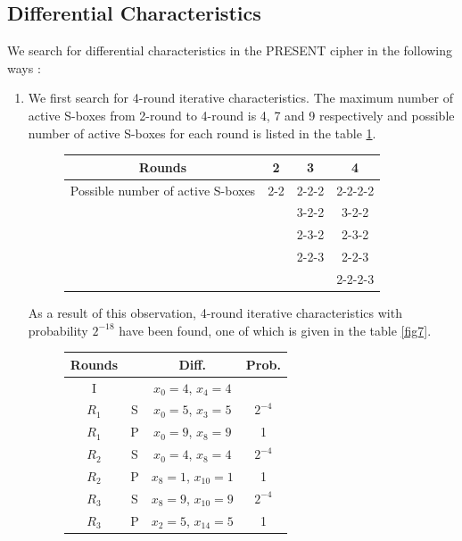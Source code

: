 \documentclass[preprint]{transcrypto}
\begin{document}
\subsection{Differential Characteristics} 
We search for differential characteristics in the PRESENT cipher in the following ways : 
\begin{enumerate}
    \item We first search for 4-round iterative characteristics. The maximum number of active S-boxes from 2-round to 4-round is 4, 7 and 9 respectively and possible number of active S-boxes for each round is listed in the table \ref{fig6}. 
    \begin{figure}[h!]
        \centering
        \begin{tabular}{ |c||c|c|c| }
            \hline
             Rounds & 2 & 3 & 4 \\ \hline \hline
             Possible number of active S-boxes& 2-2 & 2-2-2 & 2-2-2-2 \\ 
             & & 3-2-2 & 3-2-2 \\
             & & 2-3-2 & 2-3-2 \\
             & & 2-2-3 & 2-2-3 \\
             & & & 2-2-2-3 \\ \hline
        \end{tabular}
        \label{fig6}
    \end{figure}
    As a result of this observation, 4-round iterative characteristics with probability $2^{-18}$ have been found, one of which is given in the table \ref{fig7}.
    \begin{figure}[h!]
        \centering
        \begin{tabular}{ |c||c|c|c| }
            \hline
             Rounds & & Diff. & Prob. \\ \hline \hline
             I& & $x_0 = 4$, $x_4 = 4$ &  \\ 
             $R_1$& S & $x_0 = 5$, $x_{3} = 5$ & $2^{-4}$ \\
             $R_1$& P & $x_0 = 9$, $x_{8} = 9$ & 1 \\
             $R_2$& S & $x_0 = 4$, $x_{8} = 4$ & $2^{-4}$ \\
             $R_2$& P & $x_8 = 1$, $x_{10} = 1$ & 1 \\
             $R_3$& S & $x_8 = 9$, $x_{10} = 9$ & $2^{-4}$ \\
             $R_3$& P & $x_2 = 5$, $x_{14} = 5$ & 1 \\

\end{tabular}
\end{figure}
\end{enumerate}
\end{document}
